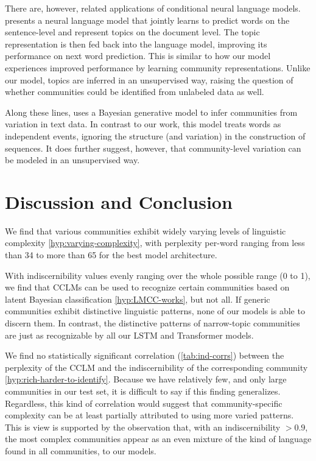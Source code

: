 \documentclass[11pt]{article}
\begin{document}
There are, however, related applications of conditional neural language models.
\citet{Lau2017a} presents a neural language model that jointly learns to predict
words on the sentence-level and represent topics on the document level.
The topic representation is then fed back into the language model, 
improving its performance on next word prediction.
This is similar to how our model experiences improved performance
by learning community representations. 
Unlike our model, topics are inferred in an unsupervised way, 
raising the question of whether communities could be identified from 
unlabeled data as well.

Along these lines, \citet{OConnor2010} uses a Bayesian generative
model to infer communities from variation in text data.  In contrast
to our work, this model treats words as independent events, ignoring
the structure (and variation) in the construction of sequences.  It
does further suggest, however, that community-level variation can be
modeled in an unsupervised way.

\section{Discussion and Conclusion}

We find that various communities exhibit widely varying levels of
linguistic complexity \ref{hyp:varying-complexity}, with perplexity
per-word ranging from less than 34 to more than 65 for the best model 
architecture.

With indiscernibility values evenly ranging over the whole possible
range (0 to 1), we find that CCLMs can be used to recognize certain
communities based on latent Bayesian classification
\ref{hyp:LMCC-works}, but not all.  If generic communities exhibit
distinctive linguistic patterns, none of our models is able to discern
them. In contrast, the distinctive patterns of narrow-topic
communities are just as recognizable by all our LSTM and Transformer
models.

We find no statistically significant correlation (\cref{tab:ind-corrs}) between the
perplexity of the
CCLM and the indiscernibility of the corresponding community
\ref{hyp:rich-harder-to-identify}. Because we have relatively few, and
only large communities in our test set, it is difficult to say if this
finding generalizes. Regardless, this kind of correlation would suggest that
community-specific complexity can be at least partially attributed to
using more varied patterns. This is view is supported by the
observation that, with an indiscernibility $> 0.9$, the most complex
communities appear as an even mixture of the kind of language found in
all communities, to our models.
\end{document}
